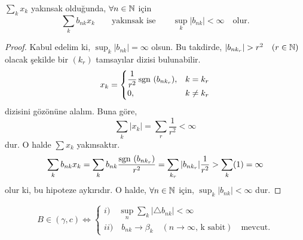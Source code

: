 \begin{lemma}
$\sum_kx_k$ yakınsak olduğunda, $\forall n\in\mathbb{N}$ için $$\sum_kb_{nk}x_k\qquad\text{yakınsak ise}\qquad\sup_k|b_{nk}|<\infty\quad\text{olur.}$$ 
\end{lemma}
\begin{proof}
Kabul edelim ki, $\sup_k|b_{nk}|=\infty$ olsun. Bu takdirde, $|b_{nk_r}|>r^2\quad(r\in\natn)$ olacak şekilde bir $(k_r)$ tamsayılar dizisi bulunabilir.
$$
x_k=
\begin{cases}
\dfrac{1}{r^2}\,\text{sgn }(b_{nk_r}), & k=k_r\\
0, & k\neq k_r
\end{cases}
$$
dizisini gözönüne alalım. Buna göre, 
$$
\sum_k|x_k|=\sum_r\frac{1}{r^2}<\infty
$$
dur. O halde $\sum x_k$ yakınsaktır.
$$
\sum_kb_{nk}x_k=\sum_kb_{nk}\dfrac{\text{sgn }(b_{nk_r})}{r^2}=\sum_{k_r}|b_{nk_r}|\frac{1}{r^2}>\sum_k(1)=\infty
$$
olur ki, bu hipoteze aykırıdır. O halde, $\forall n\in\mathbb{N}$ için, $\sup_k|b_{nk}|<\infty$ dur.
\end{proof}
\begin{theorem}
$$
B\in(\gamma,c)\iff
\begin{cases}
i)\quad\sup_n\sum_k|\bigtriangleup b_{nk}|<\infty\\
ii)\quad b_{nk}\to\beta_k\quad(n\to\infty,\,\text{k sabit})\quad\text{mevcut.}
\end{cases}
$$
\end{theorem}
